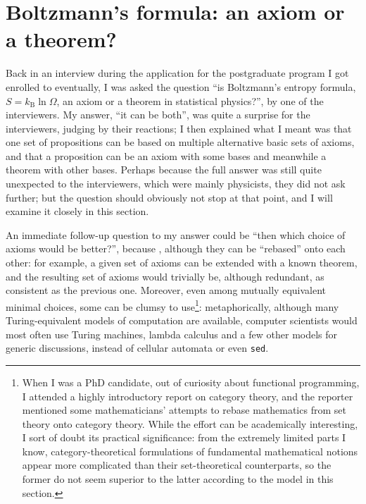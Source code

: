 \section{Boltzmann's formula: an axiom or a theorem?}\label{sec:boltzmann}

Back in an interview during the application for the postgraduate program I
got enrolled to eventually, I was asked the question ``is Boltzmann's entropy
formula, $S = k_\mathrm{B} \ln\varOmega$, an axiom or a theorem in statistical
physics?'', by one of the interviewers.  My answer, ``it can be both'', was
quite a surprise for the interviewers, judging by their reactions; I then
explained what I meant was that one set of propositions can be based on
multiple alternative basic sets of axioms, and that a proposition can be an
axiom with some bases and meanwhile a theorem with other bases.  Perhaps
because the full answer was still quite unexpected to the interviewers, which
were mainly physicists, they did not ask further; but the question should
obviously not stop at that point, and I will examine it closely in this section.

An immediate follow-up question to my answer could be ``then which choice
of axioms would be better?'', because , although they can be ``rebased'' onto each other: for example, a given
set of axioms can be extended with a known theorem, and the resulting set of
axioms would trivially be, although redundant, as consistent as the previous
one.  Moreover, even among mutually equivalent minimal choices, some can be
clumsy to use\footnote{When I was a PhD candidate, out of curiosity about
functional programming, I attended a highly introductory report on category
theory, and the reporter mentioned some mathematicians' attempts to rebase
mathematics from set theory onto category theory.  While the effort can be
academically interesting, I sort of doubt its practical significance: from
the extremely limited parts I know, category-theoretical formulations
of fundamental mathematical notions appear more complicated than their
set-theoretical counterparts, so the former do not seem superior to the
latter according to the model in this section.}: metaphorically, although
many Turing-equivalent models of computation are available, computer scientists
would most often use Turing machines, lambda calculus and a few other models
for generic discussions, instead of cellular automata or even \verb|sed|.

